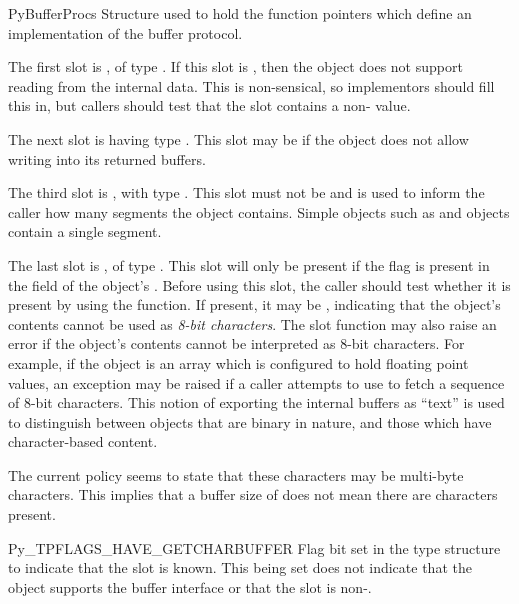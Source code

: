 \documentclass{manual}
\begin{document}
\begin{ctypedesc}{PyBufferProcs}
Structure used to hold the function pointers which define an
implementation of the buffer protocol.

The first slot is , of type
.  If this slot is \NULL{}, then the object
does not support reading from the internal data.  This is
non-sensical, so implementors should fill this in, but callers should
test that the slot contains a non-\NULL{} value.

The next slot is  having type
. This slot may be \NULL{} if the object
does not allow writing into its returned buffers.

The third slot is , with type
.  This slot must not be \NULL{} and is used to 
inform the caller how many segments the object contains.  Simple
objects such as  and
 objects contain a single segment.

The last slot is , of type
.  This slot will only be present if the
 flag is present in the
 field of the object's .  Before using
this slot, the caller should test whether it is present by using the
 function.
If present, it may be \NULL, indicating that the object's contents
cannot be used as \emph{8-bit characters}.
The slot function may also raise an error if the object's contents
cannot be interpreted as 8-bit characters.  For example, if the object
is an array which is configured to hold floating point values, an
exception may be raised if a caller attempts to use
 to fetch a sequence of 8-bit characters.
This notion of exporting the internal buffers as ``text'' is used to
distinguish between objects that are binary in nature, and those which
have character-based content.

 The current policy seems to state that these characters
may be multi-byte characters. This implies that a buffer size of
 does not mean there are  characters present.
\end{ctypedesc}

\begin{datadesc}{Py_TPFLAGS_HAVE_GETCHARBUFFER}
Flag bit set in the type structure to indicate that the
 slot is known.  This being set does not
indicate that the object supports the buffer interface or that the
 slot is non-\NULL.
\end{datadesc}
\end{document}
